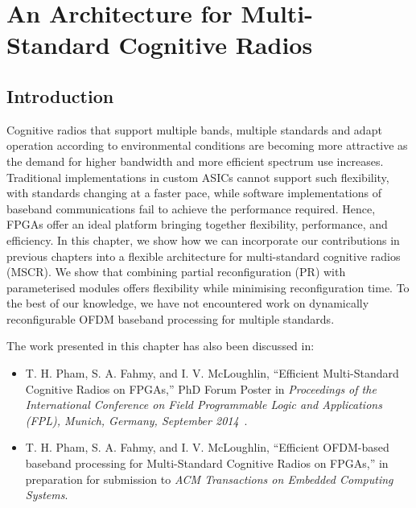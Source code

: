 \chapter{An Architecture for Multi-Standard Cognitive Radios}
\label{chap:MSCR}

\section{Introduction}
Cognitive radios that support multiple bands, multiple standards and adapt operation according to environmental conditions are becoming more attractive as the demand for higher bandwidth and more efficient spectrum use increases.
Traditional implementations in custom ASICs cannot support such flexibility, with standards changing at a faster pace, while software implementations of baseband communications fail to achieve the performance required.
Hence, FPGAs offer an ideal platform bringing together flexibility, performance, and efficiency.
In this chapter, we show how we can incorporate our contributions in previous chapters into a flexible architecture for multi-standard cognitive radios (MSCR).
We show that combining partial reconfiguration (PR) with parameterised  modules offers flexibility while minimising reconfiguration time.
To the best of our knowledge, we have not encountered work on dynamically reconfigurable OFDM baseband processing for multiple standards.

The work presented in this chapter has also been discussed in:
\begin{itemize}
\item T. H. Pham, S. A. Fahmy, and I. V. McLoughlin, ``Efficient Multi-Standard Cognitive Radios on FPGAs,'' PhD Forum Poster in \textit{Proceedings of the International Conference on Field Programmable Logic and Applications (FPL), Munich, Germany, September 2014}~\cite{Pham2014a}.
\item T. H. Pham, S. A. Fahmy, and I. V. McLoughlin, ``Efficient OFDM-based baseband processing for Multi-Standard Cognitive Radios on FPGAs,'' in preparation for submission to \emph{ACM Transactions on Embedded Computing Systems}.
\end{itemize}

